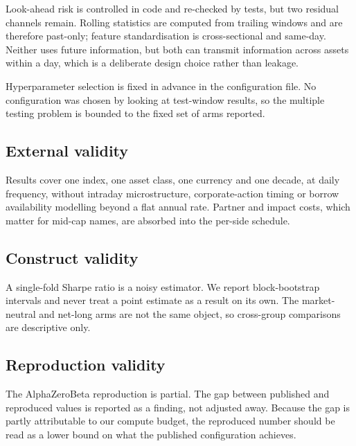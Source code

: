 \documentclass[conference]{IEEEtran}
\begin{document}
Look-ahead risk is controlled in code and re-checked by tests, but two residual
channels remain. Rolling statistics are computed from trailing windows and are
therefore past-only; feature standardisation is cross-sectional and same-day.
Neither uses future information, but both can transmit information across
assets within a day, which is a deliberate design choice rather than leakage.

Hyperparameter selection is fixed in advance in the configuration file. No
configuration was chosen by looking at test-window results, so the multiple
testing problem is bounded to the fixed set of arms reported.

\subsection*{External validity}
Results cover one index, one asset class, one currency and one decade, at daily
frequency, without intraday microstructure, corporate-action timing or borrow
availability modelling beyond a flat annual rate. Partner and impact costs,
which matter for mid-cap names, are absorbed into the per-side schedule.

\subsection*{Construct validity}
A single-fold Sharpe ratio is a noisy estimator. We report block-bootstrap
intervals and never treat a point estimate as a result on its own. The
market-neutral and net-long arms are not the same object, so cross-group
comparisons are descriptive only.

\subsection*{Reproduction validity}
The AlphaZeroBeta reproduction is partial. The gap between published and
reproduced values is reported as a finding, not adjusted away. Because the gap
is partly attributable to our compute budget, the reproduced number should be
read as a lower bound on what the published configuration achieves.
\end{document}
